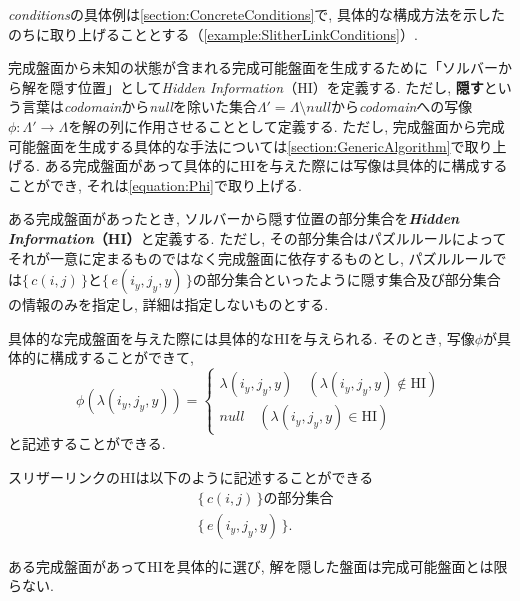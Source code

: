 \textit{conditions}の具体例は\cref{section:ConcreteConditions}で, 具体的な構成方法を示したのちに取り上げることとする（\cref{example:SlitherLinkConditions}）.

完成盤面から未知の状態が含まれる完成可能盤面を生成するために「ソルバーから解を隠す位置」として\textit{Hidden Information}（HI）を定義する.
ただし, \textbf{隠す}という言葉は\textit{codomain}から\textit{null}を除いた集合$\Lambda'=\Lambda \setminus \textit{null}$から\textit{codomain}への写像$\phi\colon \Lambda' \longrightarrow \Lambda$を解の列に作用させることとして定義する. ただし, 完成盤面から完成可能盤面を生成する具体的な手法については\cref{section:GenericAlgorithm}で取り上げる. ある完成盤面があって具体的にHIを与えた際には写像は具体的に構成することができ, それは\cref{equation:Phi}で取り上げる.

\begin{definition}\label{definition:HiddenInformation}
  ある完成盤面があったとき, ソルバーから隠す位置の部分集合を\textbf{\textit{Hidden Information}（HI）}と定義する.
  ただし, その部分集合はパズルルールによってそれが一意に定まるものではなく完成盤面に依存するものとし, パズルルールでは$\{\,c(i,j)\,\}$と$\{\,e(i_y,j_y,y)\,\}$の部分集合といったように隠す集合及び部分集合の情報のみを指定し, 詳細は指定しないものとする.
\end{definition}

具体的な完成盤面を与えた際には具体的なHIを与えられる. そのとき, 写像$\phi$が具体的に構成することができて,
\begin{equation}\label{equation:Phi}
  \phi(\lambda(i_y,j_y,y))=
  \begin{cases}
    {\lambda(i_y,j_y,y) \quad (\lambda(i_y,j_y,y) \not\in \text{HI})} \\
    {\textit{null} \quad (\lambda(i_y,j_y,y) \in \text{HI})}
  \end{cases}
\end{equation}
と記述することができる.

\begin{example}[スリザーリンクのHI]\label{example:SlitherLinkHiddenInformation}
  スリザーリンクのHIは以下のように記述することができる
  \begin{align}
     & \{\,c(i,j)\,\}の部分集合   \\
     & \{\,e(i_y,j_y,y)\,\}.
  \end{align}
\end{example}

\begin{remark}\label{remark:HI}
  ある完成盤面があってHIを具体的に選び, 解を隠した盤面は完成可能盤面とは限らない.
\end{remark}

